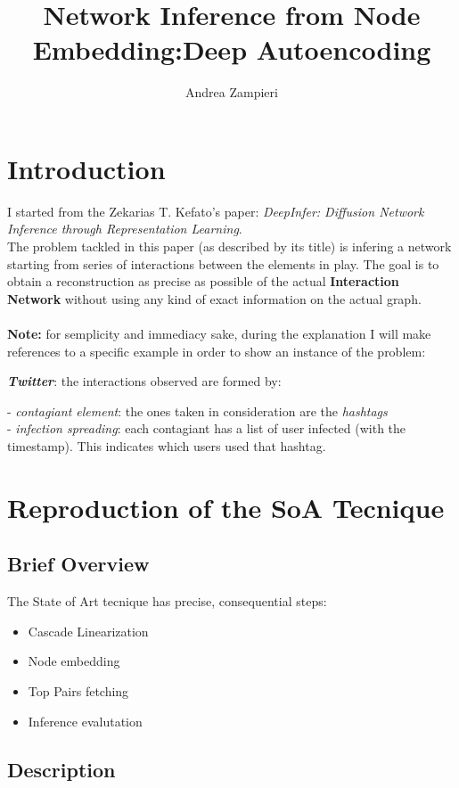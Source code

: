 \documentclass{article}
\author{Andrea Zampieri}
\title{Network Inference from Node Embedding:\newline Deep Autoencoding}
\begin{document}
	\maketitle
	\newpage
	\section{Introduction} 
		I started from the Zekarias	T. Kefato's paper: \textit{DeepInfer: Diffusion Network Inference through Representation Learning}.\\
		The problem tackled in this paper (as described by its title) is infering a network starting from series of interactions between the elements in play.
		The goal is to obtain a reconstruction as precise as possible of the actual \textbf{Interaction Network} without using any kind of exact information on the actual graph.\\ 
		\\
		\textbf{Note:} for semplicity and immediacy sake, during the explanation I will make references to a specific example in order to show an instance of the problem:\\
		
		\begin{addmargin}[2em]{0em}
			\textbf{\textit{Twitter}}: the interactions observed are formed by:\\
				\begin{addmargin}[2em]{0em}
					- \textit{contagiant element}: the ones taken in consideration are the \textit{hashtags} \\
					- \textit{infection spreading}: each contagiant has a list of user infected (with the timestamp). This indicates which users used that hashtag.
				\end{addmargin}
		\end{addmargin}
	
	\section{Reproduction of the SoA Tecnique}
		\subsection{Brief Overview}
			The State of Art tecnique has precise, consequential steps:
			\begin{itemize}
				\item Cascade Linearization
				\item Node embedding
				\item Top Pairs fetching
				\item Inference evalutation
			\end{itemize}
		\subsection{Description}
			
		
\end{document}

